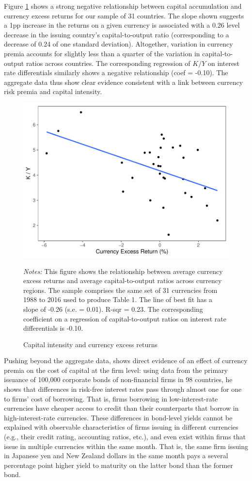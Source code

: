 \documentclass{ar-1col}
\begin{document}
Figure \ref{fig:ky_rx} shows a strong negative relationship between capital accumulation and currency excess returns for our sample of 31 countries. The slope shown suggests a 1pp increase in the returns on a given currency is associated with a 0.26 level decrease in the issuing country's capital-to-output ratio (corresponding to a decrease of 0.24 of one standard deviation). Altogether, variation in currency premia accounts for slightly less than a quarter of the variation in capital-to-output ratios across countries. The corresponding regression of $K/Y$ on interest rate differentials similarly shows a negative relationship (coef = -0.10). The aggregate data thus show clear evidence consistent with a link between currency risk premia and capital intensity. 
\begin{figure}[htp]
    \centering
    \caption{Capital intensity and currency excess returns}
    \label{fig:ky_rx}
    \includegraphics[width=0.7\linewidth]{Exhibits/Figure_KY_RX.pdf}
    \begin{minipage}[htp]{\textwidth}
    \scriptsize 
    \emph{Notes:} This figure shows the relationship between average currency excess returns and average capital-to-output ratios across currency regions. The sample comprises the same set of 31 currencies from 1988 to 2016 used to produce Table 1. The line of best fit has a slope of -0.26 (s.e. = 0.01). R-sqr = 0.23. The corresponding coefficient on a regression of capital-to-output ratios on interest rate differentials is -0.10.
    \end{minipage}
\end{figure}

Pushing beyond the aggregate data, \citet{Richers2020} shows direct evidence of an effect of currency premia on the cost of capital at the firm level: using data from the primary issuance of 100,000 corporate bonds of non-financial firms in 98 countries, he shows that differences in risk-free interest rates pass through almost one for one to firms' cost of borrowing. That is, firms borrowing in low-interest-rate currencies have cheaper access to credit than their counterparts that borrow in high-interest-rate currencies. These differences in bond-level yields cannot be explained with observable characteristics of firms issuing in different currencies (e.g., their credit rating, accounting ratios, etc.), and even exist within firms that issue in multiple currencies within the same month. That is, the same firm issuing in Japanese yen and New Zealand dollars in the same month pays a several percentage point higher yield to maturity on the latter bond than the former bond.
\end{document}
